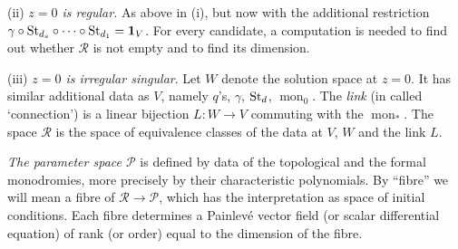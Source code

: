 \documentclass[pdftex]{sigma}
\numberwithin{equation}{section}
\begin{document}
 (ii) {\it $z=0$ is regular.} As above in (i), but now with the additional restriction $\gamma \circ {\rm St}_{d_s}\circ \dots \circ {\rm St}_{d_1}=\mathbf{1}_V$. For every candidate, a computation is needed to find out whether $\mathcal{R}$ is not empty and to find its dimension.

 (iii) {\it $z=0$ is irregular singular}. Let $W$ denote the solution space at $z=0$. It has similar additional data as $V$, namely $q$'s,
$\gamma$, ${\rm St}_d$, $\operatorname{mon}_0$. The {\it link} (in \cite{J-M-U} called `connection') is a linear bijection $L\colon W\rightarrow V$ commuting with
the $\operatorname{mon}_*$. The space $\mathcal{R}$ is the space of equivalence classes of the data at $V$, $W$ and the link $L$.


{\it The parameter space $\mathcal{P}$} is defined by data of the topological and the formal monodromies, more precisely
by their characteristic polynomials. By ``fibre'' we will mean a fibre of $\mathcal{R}\rightarrow \mathcal{P}$,
which has the interpretation as space of initial conditions. Each fibre determines a Painlev\'e vector field
(or scalar differential equation) of rank (or order) equal to the dimension of the fibre.
\end{document}
